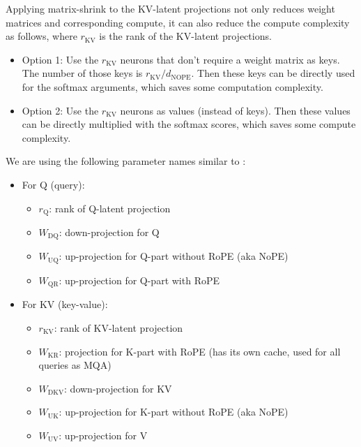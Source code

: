 \documentclass{article}
\newcommand{\WW}[1]{W_\text{#1}}                    %
\begin{document}
Applying matrix-shrink to the KV-latent projections not only reduces weight matrices and corresponding compute, it can also reduce the compute complexity as follows, where $r_\text{KV}$ is the rank of the KV-latent projections.
\begin{itemize}[topsep=-1pt, itemsep=-1pt]
  \item Option 1: Use the $r_\text{KV}$ neurons that don’t require a weight matrix as keys. The number of those keys is $r_\text{KV} / d_\text{NOPE}$. Then these keys can be directly used for the softmax arguments, which saves some computation complexity.
  \item Option 2: Use the $r_\text{KV}$ neurons as values (instead of keys). Then these values can be directly multiplied with the softmax scores, which saves some compute complexity.
\end{itemize}

We are using the following parameter names similar to \citep{deepseek-v2}:
\begin{itemize}[topsep=-1pt, itemsep=-1pt]
  \item For Q (query):
  \begin{itemize}[topsep=-1pt, itemsep=-1pt]
    \item $r_\text{Q}$: rank of Q-latent projection
    \item $\WW{DQ}$: down-projection for Q
    \item $\WW{UQ}$: up-projection for Q-part without RoPE (aka NoPE)
    \item $\WW{QR}$: up-projection for Q-part with RoPE
  \end{itemize}
  \item For KV (key-value):
  \begin{itemize}[topsep=-1pt, itemsep=-1pt]
    \item $r_\text{KV}$: rank of KV-latent projection
    \item $\WW{KR}$: projection for K-part with RoPE (has its own cache, used for all queries as MQA)
    \item $\WW{DKV}$: down-projection for KV
    \item $\WW{UK}$: up-projection for K-part without RoPE (aka NoPE)
    \item $\WW{UV}$: up-projection for V
  \end{itemize}
\end{itemize}

\def\dsRone     {\href{https://huggingface.co/deepseek-ai/DeepSeek-R1}         {DeepSeek-R1}}
\def\dsVthree   {\href{https://huggingface.co/deepseek-ai/DeepSeek-V3}         {V3}}
\def\dsVtwoFive {\href{https://huggingface.co/deepseek-ai/DeepSeek-V2.5}       {DeepSeek-V2.5}}
\def\dsVtwoL    {\href{https://huggingface.co/deepseek-ai/DeepSeek-V2-Lite}    {DeepSeek-V2-lite}}
\def\MiniCPM    {\href{https://huggingface.co/openbmb/MiniCPM3-4B}             {MiniCPM3-4B}}
\end{document}
